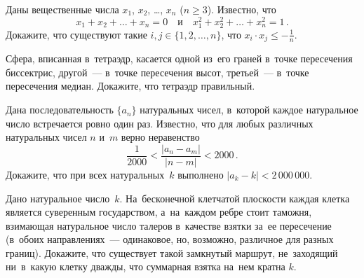 


\begin{problems}

\item
Даны вещественные числа $x_{1}$, $x_{2}$, \ldots, $x_{n}$ ($n \geq 3$).
Известно, что \[
    x_{1} + x_{2} + \ldots + x_{n} = 0
\quad\text{и}\quad
    x_{1}^2 + x_{2}^2 + \ldots + x_{n}^2 = 1
\, . \]
Докажите, что существуют такие $i, j \in \{1, 2, \ldots,  n\}$, что
$x_{i} \cdot x_{j} \leq -\frac{1}{n}$.

\item
Сфера, вписанная в~тетраэдр, касается одной из~его граней в~точке пересечения
биссектрис, другой~--- в~точке пересечения высот, третьей~--- в~точке
пересечения медиан.
Докажите, что тетраэдр правильный.

\item
Дана последовательность $\{a_{n}\}$ натуральных чисел, в~которой каждое
натуральное число встречается ровно один раз.
Известно, что для любых различных натуральных чисел $n$ и~$m$ верно неравенство
\[
    \frac{1}{2000} < \frac{|a_{n} - a_{m}|}{|n - m|} < 2000
\, . \]
Докажите, что при всех натуральных~$k$ выполнено $|a_{k} - k| < 2\,000\,000$.

\item
Дано натуральное число~$k$.
На~бесконечной клетчатой плоскости каждая клетка является суверенным
государством, а~на~каждом ребре стоит таможня, взимающая натуральное число
талеров в~качестве взятки за~ее пересечение (в~обоих направлениях~---
одинаковое, но, возможно, различное для разных границ).
Докажите, что существует такой замкнутый маршрут, не~заходящий ни~в~какую
клетку дважды, что суммарная взятка на~нем кратна $k$.

\end{problems}

